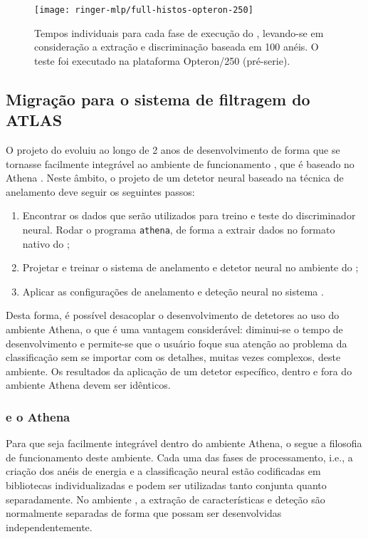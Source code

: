 \begin{figure}
\begin{center}
\texttt{[image: ringer-mlp/full-histos-opteron-250]}
\end{center}
\caption{Tempos individuais para cada fase de execução do ,
levando-se em consideração a extração e discriminação baseada em 100 anéis. O
teste foi executado na plataforma Opteron/250 (pré-serie).}
\label{fig:p1-full-histos}
\end{figure}

\subsection{Migração para o sistema de filtragem do ATLAS}

O projeto do  evoluiu ao longo de 2 anos de desenvolvimento
de forma que se tornasse facilmente integrável ao ambiente de funcionamento
, que é baseado no  Athena
\cite{athena:home-page, athena:devel-guide}. Neste âmbito, o projeto de um
detetor neural baseado na técnica de anelamento deve seguir os seguintes
passos:

\begin{enumerate}
\item Encontrar os dados que serão utilizados para treino e teste do
discriminador neural. Rodar o programa \texttt{athena}, de forma a extrair
dados no formato nativo do ;
\item Projetar e treinar o sistema de anelamento e detetor neural no ambiente
do ;
\item Aplicar as configurações de anelamento e deteção neural no sistema
.
\end{enumerate}

Desta forma, é possível desacoplar o desenvolvimento de detetores ao uso do
ambiente Athena, o que é uma vantagem considerável: diminui-se o tempo de
desenvolvimento e permite-se que o usuário foque sua atenção ao problema da
classificação sem se importar com os detalhes, muitas vezes complexos, deste
ambiente. Os resultados da aplicação de um detetor específico, dentro e fora
do ambiente Athena devem ser idênticos.

\subsubsection{ e o Athena}

Para que seja facilmente integrável dentro do ambiente Athena, o
 segue a filosofia de funcionamento deste ambiente. Cada uma
das fases de processamento, i.e., a criação dos anéis de energia e a
classificação neural estão codificadas em bibliotecas individualizadas e podem
ser utilizadas tanto conjunta quanto separadamente. No ambiente
, a extração de características e deteção são normalmente
separadas de forma que possam ser desenvolvidas independentemente.

